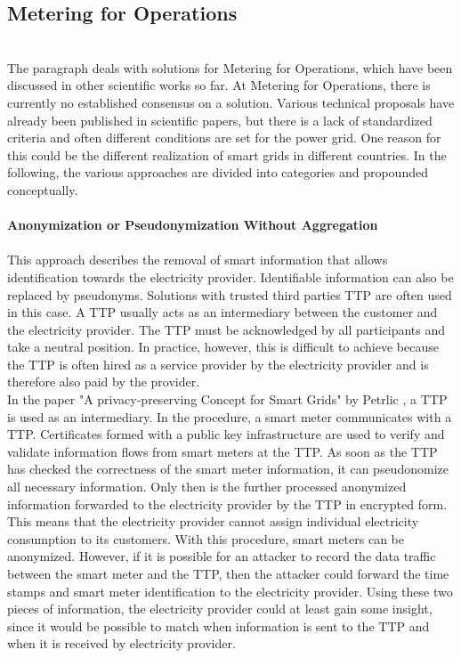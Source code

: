 \subsection{Metering for Operations}
\label{subsec:Meter_for_Op}
\\
The paragraph deals with solutions for Metering for Operations, which have been discussed in other scientific works so far. At Metering for Operations, there is currently no established consensus on a solution. Various technical proposals have already been published in scientific papers, but there is a lack of standardized criteria and often different conditions are set for the power grid. One reason for this could be the different realization of smart grids in different countries. In the following, the various approaches are divided into categories and propounded conceptually.\\
\\
\textbf{Anonymization or Pseudonymization
Without Aggregation}
\\
\\
This approach describes the removal of smart information that allows identification towards the electricity provider. Identifiable information can also be replaced by pseudonyms. Solutions with trusted third parties \gls{TTP} are often used in this case. A \gls{TTP} usually acts as an intermediary between the customer and the electricity provider. The \gls{TTP} must be acknowledged by all participants and take a neutral position. In practice, however, this is difficult to achieve because the \gls{TTP} is often hired as a service provider by the electricity provider and is therefore also paid by the provider.\\
In the paper "A privacy-preserving Concept for Smart Grids" by Petrlic \cite{petrlic2010privacy}, a \gls{TTP} is used as an intermediary. In the procedure, a smart meter communicates with a \gls{TTP}. Certificates formed with a public key infrastructure are used to verify and validate information flows from smart meters at the \gls{TTP}. As soon as the \gls{TTP} has checked the correctness of the smart meter information, it can pseudonomize all necessary information. Only then is the further processed anonymized information forwarded to the electricity provider by the \gls{TTP} in encrypted form. This means that the electricity provider cannot assign individual electricity consumption to its customers. With this procedure, smart meters can be anonymized. 
However, if it is possible for an attacker to record the data traffic between the smart meter and the \gls{TTP}, then the attacker could forward the time stamps and smart meter identification to the electricity provider. Using these two pieces of information, the electricity provider could at least gain some insight, since it would be possible to match when information is sent to the \gls{TTP} and when it is received by electricity provider\cite{finster2014privacy}. \\
